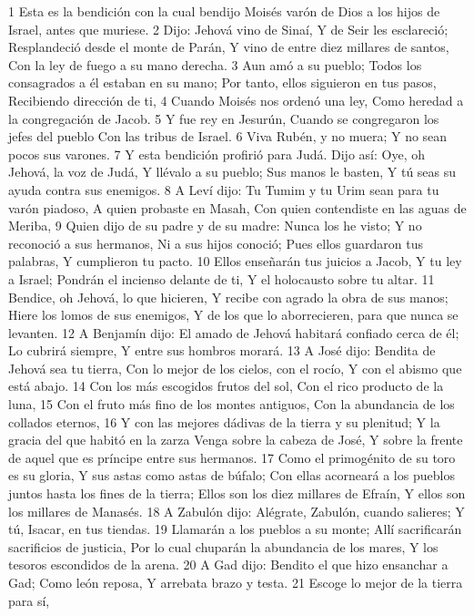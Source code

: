 1 Esta es la bendición con la cual bendijo Moisés varón de Dios a los hijos de Israel, antes que muriese.
2 Dijo:
Jehová vino de Sinaí,
Y de Seir les esclareció;
Resplandeció desde el monte de Parán,
Y vino de entre diez millares de santos,
Con la ley de fuego a su mano derecha. 
3 Aun amó a su pueblo;
Todos los consagrados a él estaban en su mano;
Por tanto, ellos siguieron en tus pasos,
Recibiendo dirección de ti,
4 Cuando Moisés nos ordenó una ley,
Como heredad a la congregación de Jacob.
5 Y fue rey en Jesurún,
Cuando se congregaron los jefes del pueblo
Con las tribus de Israel.
6 Viva Rubén, y no muera;
Y no sean pocos sus varones.
7 Y esta bendición profirió para Judá. Dijo así:
Oye, oh Jehová, la voz de Judá,
Y llévalo a su pueblo;
Sus manos le basten,
Y tú seas su ayuda contra sus enemigos.
8 A Leví dijo:
Tu Tumim y tu Urim sean para tu varón piadoso,
A quien probaste en Masah, 
Con quien contendiste en las aguas de Meriba, 
9 Quien dijo de su padre y de su madre: Nunca los he visto; 
Y no reconoció a sus hermanos,
Ni a sus hijos conoció;
Pues ellos guardaron tus palabras,
Y cumplieron tu pacto.
10 Ellos enseñarán tus juicios a Jacob,
Y tu ley a Israel;
Pondrán el incienso delante de ti,
Y el holocausto sobre tu altar.
11 Bendice, oh Jehová, lo que hicieren,
Y recibe con agrado la obra de sus manos;
Hiere los lomos de sus enemigos,
Y de los que lo aborrecieren, para que nunca se levanten.
12 A Benjamín dijo:
El amado de Jehová habitará confiado cerca de él;
Lo cubrirá siempre,
Y entre sus hombros morará. 
13 A José dijo:
Bendita de Jehová sea tu tierra,
Con lo mejor de los cielos, con el rocío,
Y con el abismo que está abajo.
14 Con los más escogidos frutos del sol,
Con el rico producto de la luna,
15 Con el fruto más fino de los montes antiguos,
Con la abundancia de los collados eternos,
16 Y con las mejores dádivas de la tierra y su plenitud;
Y la gracia del que habitó en la zarza
Venga sobre la cabeza de José,
Y sobre la frente de aquel que es príncipe entre sus hermanos.
17 Como el primogénito de su toro es su gloria,
Y sus astas como astas de búfalo;
Con ellas acorneará a los pueblos juntos hasta los fines de la tierra;
Ellos son los diez millares de Efraín,
Y ellos son los millares de Manasés. 
18 A Zabulón dijo:
Alégrate, Zabulón, cuando salieres;
Y tú, Isacar, en tus tiendas.
19 Llamarán a los pueblos a su monte;
Allí sacrificarán sacrificios de justicia,
Por lo cual chuparán la abundancia de los mares,
Y los tesoros escondidos de la arena.
20 A Gad dijo:
Bendito el que hizo ensanchar a Gad;
Como león reposa,
Y arrebata brazo y testa.
21 Escoge lo mejor de la tierra para sí,
